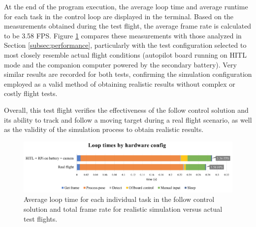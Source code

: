 At the end of the program execution, the average loop time and average runtime for each task in the control loop are displayed in the terminal. Based on the measurements obtained during the test flight, the average frame rate is calculated to be 3.58 FPS. Figure \ref{fig:flight-performance} compares these measurements with those analyzed in Section \ref{subsec:performance}, particularly with the test configuration selected to most closely resemble actual flight conditions (autopilot board running on HITL mode and the companion computer powered by the secondary battery). Very similar results are recorded for both tests, confirming the simulation configuration employed as a valid method of obtaining realistic results without complex or costly flight tests.

Overall, this test flight verifies the effectiveness of the follow control solution and its ability to track and follow a moving target during a real flight scenario, as well as the validity of the simulation process to obtain realistic results.


\begin{figure}
  \centering
  \includegraphics[width=\textwidth, keepaspectratio]{img/perf-hitl-flight.png}
  \caption{Average loop time for each individual task in the follow control solution and total frame rate for realistic simulation versus actual test flights.}
  \label{fig:flight-performance}
\end{figure}
